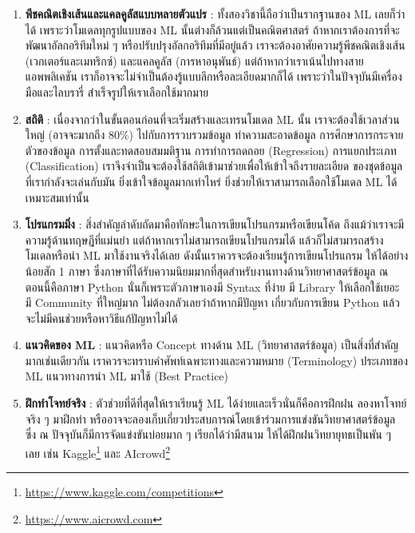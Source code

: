 \begin{enumerate}
    \item \textbf{พีชคณิตเชิงเส้นและแคลคูลัสแบบหลายตัวแปร} : ทั้งสองวิชานี้ถือว่าเป็นรากฐานของ ML เลยก็ว่าได้ 
    เพราะว่าโมเดลทุกรูปแบบของ ML นั้นต่างก็ล้วนแต่เป็นคณิตศาสตร์ ถ้าหากเราต้องการที่จะพัฒนาอัลกอริทึมใหม่ ๆ 
    หรือปรับปรุงอัลกอริทึมที่มีอยู่แล้ว เราจะต้องอาศัยความรู้พีชคณิตเชิงเส้น (เวกเตอร์และเมทริกซ์) และแคลคูลัส (การหาอนุพันธ์) 
    แต่ถ้าหากว่าเราเน้นไปทางสายแอพพลิเคชัน เราก็อาจจะไม่จำเป็นต้องรู้แบบลึกหรือละเอียดมากก็ได้ เพราะว่าในปัจจุบันมีเครื่องมือและไลบรารี่%
    สำเร็จรูปให้เราเลือกใช้มากมาย
    \item \textbf{สถิติ} : เนื่องจากว่าในขั้นตอนก่อนที่จะเริ่มสร้างและเทรนโมเดล ML นั้น เราจะต้องใช้เวลาส่วนใหญ่ 
    (อาจจะมากถึง 80\%) ไปกับการรวบรวมข้อมูล ทำความสะอาดข้อมูล การศึกษาการกระจายตัวของข้อมูล การตั้งและทดสอบสมมติฐาน 
    การทำการถดถอย (Regression) การแยกประเภท (Classification) เราจึงจำเป็นจะต้องใช้สถิติเข้ามาช่วยเพื่อให้เข้าใจถึงรายละเอียด
    ของชุดข้อมูลที่เรากำลังจะเล่นกับมัน ยิ่งเข้าใจข้อมูลมากเท่าไหร่ ยิ่งช่วยให้เราสามารถเลือกใช้โมเดล ML ได้เหมาะสมเท่านั้น 
    \item \textbf{โปรแกรมมิ่ง} : สิ่งสำคัญลำดับถัดมาคือทักษะในการเขียนโปรแกรมหรือเขียนโค้ด ถึงแม้ว่าเราจะมีความรู้ด้านทฤษฎีที่แม่นยำ 
    แต่ถ้าหากเราไม่สามารถเขียนโปรแกรมได้ แล้วก็ไม่สามารถสร้างโมเดลหรือนำ ML มาใช้งานจริงได้เลย ดังนั้นเราควรจะต้องเรียนรู้การเขียนโปรแกรม
    ให้ได้อย่างน้อยสัก 1 ภาษา ซึ่งภาษาที่ได้รับความนิยมมากที่สุดสำหรับงานทางด้านวิทยาศาสตร์ข้อมูล ณ ตอนนี้คือภาษา Python 
    นั่นก็เพราะตัวภาษาเองมี Syntax ที่ง่าย มี Library ให้เลือกใช้เยอะ มี Community ที่ใหญ่มาก ไม่ต้องกลัวเลยว่าถ้าหากมีปัญหา%
    เกี่ยวกับการเขียน Python แล้วจะไม่มีคนช่วยหรือหาวิธีแก้ปัญหาไม่ได้
    \item \textbf{แนวคิดของ ML} : แนวคิดหรือ Concept ทางด้าน ML (วิทยาศาสตร์ข้อมูล) เป็นสิ่งที่สำคัญมากเช่นเดียวกัน
    เราควรจะทราบคำศัพท์เฉพาะทางและความหมาย (Terminology) ประเภทของ ML แนวทางการนำ ML มาใช้ (Best Practice)
    \item \textbf{ฝึกทำโจทย์จริง} : ตัวช่วยที่ดีที่สุดให้เราเรียนรู้ ML ได้ง่ายและเร็วนั่นก็คือการฝึกฝน ลองหาโจทย์จริง ๆ มาฝึกทำ
    หรืออาจจะลองเก็บเกี่ยวประสบการณ์โดยเข้าร่วมการแข่งขันวิทยาศาสตร์ข้อมูล ซึ่ง ณ ปัจจุบันก็มีการจัดแข่งขันบ่อยมาก ๆ เรียกได้ว่ามีสนาม
    ให้ได้ฝึกฝนวิทยายุทธเป็นพัน ๆ เลย เช่น Kaggle\footnote{\url{https://www.kaggle.com/competitions}} และ
    AIcrowd\footnote{\url{https://www.aicrowd.com}} 
\end{enumerate}

